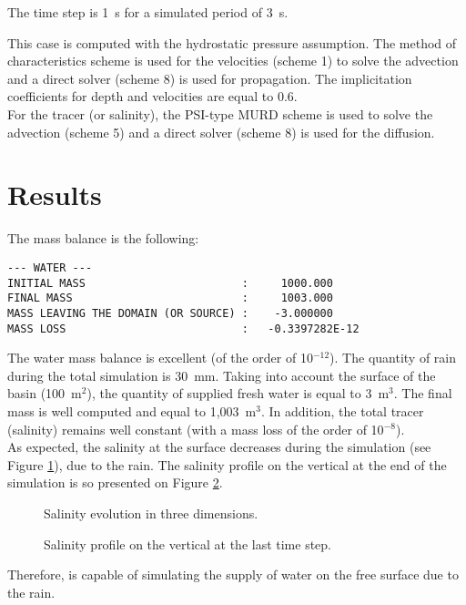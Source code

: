 \bigskip
The time step is 1~s for a simulated period of 3~s.

\bigskip
This case is computed with the hydrostatic pressure assumption.
The method of characteristics scheme
is used for the velocities (scheme 1) to solve the advection and
a direct solver (scheme 8) is used for propagation.
The implicitation coefficients for depth
and velocities are equal to 0.6.\\
For the tracer (or salinity), the PSI-type MURD scheme
is used to solve the advection (scheme 5) and
a direct solver (scheme 8) is used for the diffusion.

%
%
\section{Results}
\bigskip
The mass balance is the following:
\begin{lstlisting}[language=TelFortran]
--- WATER ---
INITIAL MASS                        :     1000.000
FINAL MASS                          :     1003.000
MASS LEAVING THE DOMAIN (OR SOURCE) :    -3.000000
MASS LOSS                           :   -0.3397282E-12
\end{lstlisting}
The water mass balance is excellent (of the order of 10$^{-12}$).
The quantity of rain during the total simulation is 30~mm.
Taking into account the surface of the basin (100~m$^2$), the quantity
of supplied fresh water is equal to 3~m$^3$. The final mass is well
computed and equal to 1,003~m$^3$.
In addition, the total tracer (salinity) remains well constant (with a mass loss of the order
of 10$^{-8}$).\\
As expected, the salinity at the surface decreases during the
simulation (see Figure \ref{t3d:pluie:fig:sal_evol}), due to the rain.
The salinity profile on the vertical at the end of the simulation is so
presented on Figure \ref{t3d:pluie:fig:sal_final}.

%
\begin{figure}[!htbp]
 \centering
 \caption{Salinity evolution in three dimensions.}
 \label{t3d:pluie:fig:sal_evol}
\end{figure}
\begin{figure}[!htbp]
 \centering
 \caption{Salinity profile on the vertical at the last time step.}
 \label{t3d:pluie:fig:sal_final}
\end{figure}
%
\bigskip
Therefore,  is capable of simulating the supply of water on the free
surface due to the rain.
%

